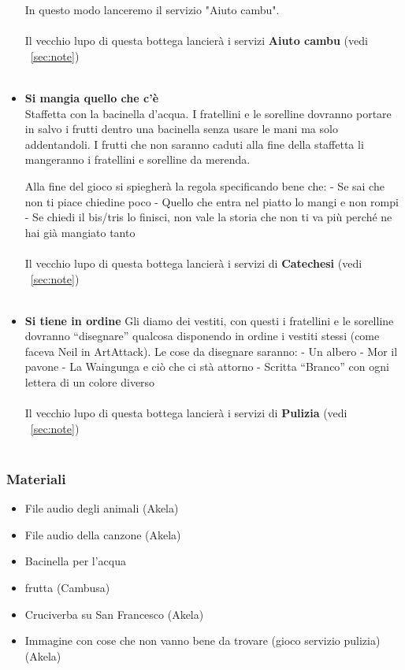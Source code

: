 \documentclass[../main.tex]{subfiles}
\begin{document}
\begin{itemize}
           In questo modo lanceremo il servizio "Aiuto cambu".\\
            \\
            Il vecchio lupo di questa bottega lancierà i servizi \textbf{Aiuto cambu} (vedi ~\ref{sec:note})\\
            \\
        \item
        \textbf{Si mangia quello che c'è}\\
Staffetta con la bacinella d'acqua. I fratellini e le sorelline dovranno portare in salvo i frutti dentro una bacinella senza usare le mani ma solo addentandoli. I frutti che non saranno caduti alla fine della staffetta li mangeranno i fratellini e sorelline da merenda.

Alla fine del gioco si spiegherà la regola specificando bene che:
- Se sai che non ti piace chiedine poco
- Quello che entra nel piatto lo mangi e non rompi
- Se chiedi il bis/tris lo finisci, non vale la storia che non ti va più perché ne hai già mangiato tanto\\
            \\
            Il vecchio lupo di questa bottega lancierà i servizi di \textbf{Catechesi} (vedi ~\ref{sec:note})\\
            \\
        \item
         \textbf{Si tiene in ordine}
Gli diamo dei vestiti, con questi i fratellini e le sorelline dovranno “disegnare” qualcosa disponendo in ordine i vestiti stessi (come faceva Neil in ArtAttack).
Le cose da disegnare saranno:
- Un albero
- Mor il pavone
- La Waingunga e ciò che ci stà attorno
- Scritta “Branco” con ogni lettera di un colore diverso\\
            \\
            Il vecchio lupo di questa bottega lancierà i servizi di \textbf{Pulizia} (vedi ~\ref{sec:note})\\
            \\
        \end{itemize}
        
        \subsubsection{Materiali}
            \begin{itemize}
                \item File audio degli animali  (Akela)
                \item File audio della canzone  (Akela)
                \item Bacinella per l'acqua
                \item frutta (Cambusa)
                \item Cruciverba su San Francesco (Akela)
                \item Immagine con cose che non vanno bene da trovare (gioco servizio pulizia)    (Akela)
            \end{itemize}
\end{document}
